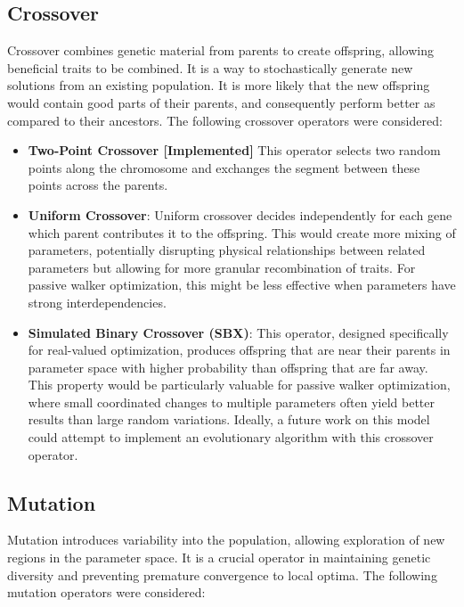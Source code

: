 \subsection{Crossover}
Crossover combines genetic material from parents to create offspring, allowing beneficial traits to be combined.
It is a way to stochastically generate new solutions from an existing population.
It is more likely that the new offspring would contain good parts of their parents, and consequently perform better as compared to their ancestors.\cite{Ahmad2018}
The following crossover operators were considered:

\begin{itemize}
    \item \textbf{Two-Point Crossover [Implemented]}
    This operator selects two random points along the chromosome and exchanges the segment between these points across the parents.
    
    \item \textbf{Uniform Crossover}:
    Uniform crossover decides independently for each gene which parent contributes it to the offspring.
    This would create more mixing of parameters, potentially disrupting physical relationships between related parameters but allowing for more granular recombination of traits.
    For passive walker optimization, this might be less effective when parameters have strong interdependencies.

    \item \textbf{Simulated Binary Crossover (SBX)}:
    This operator, designed specifically for real-valued optimization, produces offspring that are near their parents in parameter space with higher probability than offspring that are far away.
    This property would be particularly valuable for passive walker optimization, where small coordinated changes to multiple parameters often yield better results than large random variations.
    Ideally, a future work on this model could attempt to implement an evolutionary algorithm with this crossover operator.
\end{itemize}


\subsection{Mutation}
Mutation introduces variability into the population, allowing exploration of new regions in the parameter space.
It is a crucial operator in maintaining genetic diversity and preventing premature convergence to local optima.
The following mutation operators were considered:

